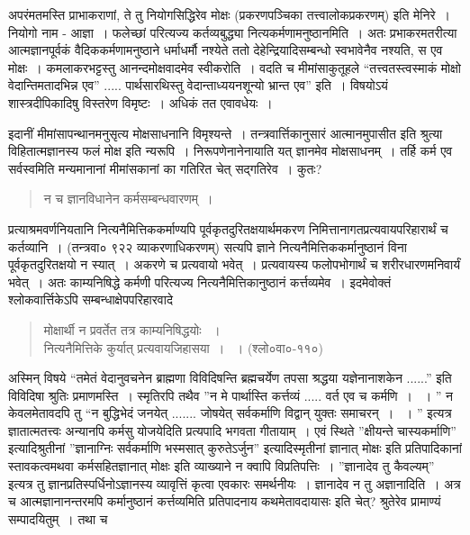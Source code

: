 {अपरंमतमस्ति प्राभाकराणां, ते तु नियोगसिद्धिरेव मोक्षः (प्रकरणपञ्चिका तत्त्वालोकप्रकरणम्) इति मेनिरे~। नियोगो नाम - आज्ञा~। फलेच्छां परित्यज्य कर्तव्यबुद्ध्या नित्यकर्मणामनुष्ठानमिति~। अतः प्रभाकरमतरीत्या आत्मज्ञानपूर्वकं वैदिककर्मणामनुष्ठाने धर्माधर्मौ नश्येते ततो देहेन्द्रियादिसम्बन्धो स्वभावेनैव नश्यति, स एव मोक्षः~। कमलाकरभट्टस्तु आनन्दमोक्षवादमेव स्वीकरोति~। वदति च मीमांसाकुतूहले “तत्त्वतस्त्वस्माकं मोक्षो वेदान्तिमतादभिन्न एव” ..... पार्थसारथिस्तु वेदान्ताध्ययनशून्यो भ्रान्त एव” इति~। विषयोऽयं शास्त्रदीपिकादिषु विस्तरेण विमृष्टः~। अधिकं तत एवावधेयः~। 

इदानीं मीमांसापन्थानमनुसृत्य मोक्षसाधनानि विमृश्यन्ते~। तन्त्रवार्त्तिकानुसारं आत्मानमुपासीत इति श्रुत्या विहितात्मज्ञानस्य फलं मोक्ष इति न्यरूपि~। निरूपणेनानेनायाति यत् ज्ञानमेव मोक्षसाधनम्~। तर्हि कर्म एव सर्वस्वमिति मन्यमानानां मीमांसकानां का गतिरित चेत्  सद्गतिरेव~। कुतः?
\begin{verse}
न च ज्ञानविधानेन कर्मसम्बन्धवारणम्~। 
\end{verse}

प्रत्याश्रमवर्णनियतानि नित्यनैमित्तिककर्माण्यपि पूर्वकृतदुरितक्षयार्थमकरण निमित्तानागतप्रत्यवायपरिहारार्थं च कर्तव्यानि~। (तन्त्रवा० ९२२ व्याकरणाधिकरणम्) सत्यपि ज्ञाने नित्यनैमित्तिककर्मानुष्ठानं विना पूर्वकृतदुरितक्षयो न स्यात्~। अकरणे च प्रत्यवायो भवेत्~। प्रत्यवायस्य फलोपभोगार्थं च शरीरधारणमनिवार्यं भवेत्~। अतः काम्यनिषिद्धे कर्मणी परित्यज्य नित्यनैमित्तिकानुष्ठानं कर्त्तव्यमेव~। इदमेवोक्तं श्लोकवार्त्तिकेऽपि सम्बन्धाक्षेपपरिहारवादे

\begin{verse}
मोक्षार्थी न प्रवर्तेत तत्र काम्यनिषिद्धयोः ~। \\
नित्यनैमित्तिके कुर्यात् प्रत्यवायजिहासया~। ~। (श्लो०वा०-११०)
\end{verse}

अस्मिन् विषये “तमेतं वेदानुवचनेन ब्राह्मणा विविदिषन्ति ब्रह्मचर्येण तपसा श्रद्धया यज्ञेनानाशकेन ......” इति विविदिषा श्रुतिः प्रमाणमस्ति~। स्मृतिरपि तथैव ”न मे पार्थास्ति कर्त्तव्यं ..... वर्त एव च कर्मणि~। ~। ” न केवलमेतावदपि तु “न बुद्धिभेदं जनयेत् ....... जोषयेत् सर्वकर्माणि विद्वान् युक्तः समाचरन्~। ~। ” इत्यत्र ज्ञातात्मतत्त्वः अन्यानपि कर्मसु योजयेदिति प्रत्यपादि भगवता गीतायाम्~। एवं स्थिते ”क्षीयन्ते चास्यकर्माणि” इत्यादिश्रुतीनां ”ज्ञानाग्निः सर्वकर्माणि भस्मसात् कुरुतेऽर्जुन” इत्यादिस्मृतीनां ज्ञानात् मोक्षः इति प्रतिपादिकानां स्तावकत्वमथवा कर्मसहितज्ञानात् मोक्षः इति व्याख्याने न क्वापि विप्रतिपत्तिः~। ”ज्ञानादेव तु कैवल्यम्” इत्यत्र तु ज्ञानप्रतिस्पर्धिनोऽज्ञानस्य व्यावृत्तिं कृत्वा एवकारः समर्थनीयः~। ज्ञानादेव न तु अज्ञानादिति~। अत्र च आत्मज्ञानानन्तरमपि कर्मानुष्ठानं कर्त्तव्यमिति प्रतिपादनाय कथमेतावदायासः इति चेत्? श्रुतेरेव प्रामाण्यं सम्पादयितुम्~। तथा च 

}
